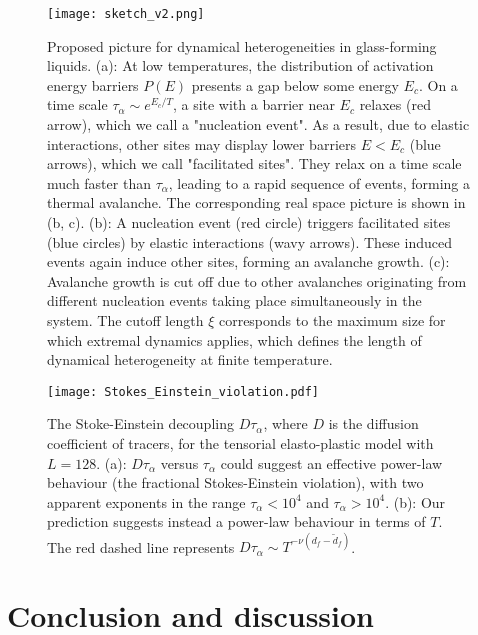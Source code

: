 \documentclass[pre,twocolumn,superscriptaddress,tightenlines,showpacs,longbibliography,floatfix,footinbib]{revtex4-1}
\newcommand{\MO}[1]{{\bf \color{red} $^{MO}$ #1}}
\begin{document}
\begin{figure}[bht!]
\centering
\texttt{[image: sketch\_v2.png]}
\caption{
Proposed picture for dynamical heterogeneities in glass-forming liquids. (a): At low temperatures, the distribution of activation energy barriers $P(E)$ presents a gap below some energy $E_c$. On a time scale $\tau_\alpha \sim e^{E_c/T}$, a site with a barrier near $E_c$ relaxes (red arrow), which we call a "nucleation event". As a result, due to elastic interactions, other sites may display lower barriers $E<E_c$ (blue arrows), which we call "facilitated sites". They relax on a time scale much faster than $\tau_\alpha$, leading to a rapid sequence of events, forming a thermal avalanche. The corresponding real space picture is shown in (b, c). 
(b): A nucleation event (red circle) triggers facilitated sites (blue circles) by elastic interactions (wavy arrows). These induced events again induce other sites, forming an avalanche growth. 
(c): Avalanche growth is cut off due to other avalanches originating from different nucleation events taking place simultaneously in the system.
The cutoff length $\xi$ corresponds to the maximum size for which extremal dynamics applies, which defines the length of dynamical heterogeneity at finite temperature. }
\label{fig:sketch}
\end{figure}


\begin{figure}
\centering
\texttt{[image: Stokes\_Einstein\_violation.pdf]}
\caption{The Stoke-Einstein decoupling $D \tau_\alpha$, where $D$ is the diffusion coefficient of tracers, for the tensorial elasto-plastic model with $L=128$. (a): $D \tau_\alpha$ versus $\tau_\alpha$  could suggest an effective power-law behaviour (the fractional Stokes-Einstein violation), with two apparent exponents in the range $\tau_\alpha<10^4$ and $\tau_\alpha>10^4$. (b): Our prediction suggests instead a power-law behaviour in terms of $T$. The red dashed line represents $D \tau_\alpha \sim T^{-\nu(d_f-\tilde d_f)}$.}
\label{fig:Stokes_Einstein_violation}
\end{figure}


\section{Conclusion and discussion}
\label{sec:conclusion}
\end{document}
